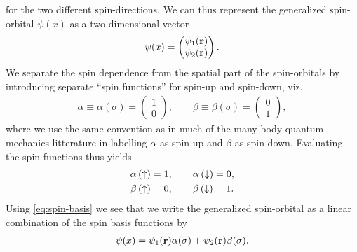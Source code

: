         for the two different spin-directions. We can thus represent the
        generalized spin-orbital $\psi(x)$ as a two-dimensional vector
        \begin{align}
            \psi(x) = \begin{pmatrix}
                \psi_1(\mathbf{r}) \\
                \psi_2(\mathbf{r})
            \end{pmatrix}.
        \end{align}
        We separate the spin dependence from the spatial part of the
        spin-orbitals by introducing separate ``spin functions'' for spin-up and
        spin-down, viz.
        \begin{align}
            \alpha \equiv \alpha(\sigma) = \begin{pmatrix}
                1 \\
                0
            \end{pmatrix},
            \qquad
            \beta \equiv \beta(\sigma) = \begin{pmatrix}
                0 \\
                1
            \end{pmatrix},
            \label{eq:spin-basis}
        \end{align}
        where we use the same convention as in much of the many-body quantum
        mechanics litterature in labelling $\alpha$ as spin up and $\beta$ as
        spin down. Evaluating the spin functions thus yields
        \begin{gather}
            \alpha\left( \uparrow \right) = 1, \qquad \alpha\left( \downarrow \right) = 0, \\
            \beta\left( \uparrow \right) = 0, \qquad \beta\left( \downarrow \right) = 1.
        \end{gather}
        Using \autoref{eq:spin-basis} we see that we write the
        generalized spin-orbital as a linear combination of the spin basis
        functions by
        \begin{align}
            \psi(x)
            = \psi_1(\mathbf{r})\alpha(\sigma)
            + \psi_2(\mathbf{r})\beta(\sigma).
        \end{align}




